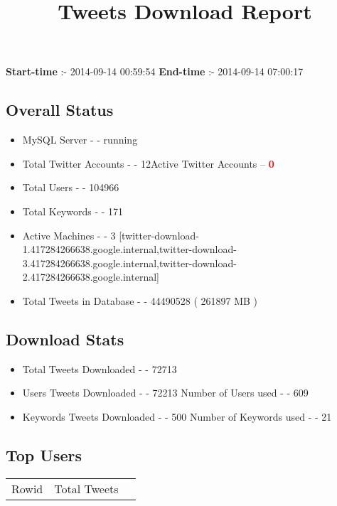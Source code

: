 \documentclass{article}\usepackage[T1]{fontenc}
\begin{document}
\title{\textbf{Tweets Download Report}}
               \date{}
                \maketitle
               \centerline{\textbf{Start-time} :- 2014-09-14 00:59:54 \hspace{40pt} \textbf{End-time} :- 2014-09-14 07:00:17}               \subsection*{Overall Status}                \begin{itemize}                \item MySQL Server - - running               \item Total Twitter Accounts - - 12\newline Active Twitter Accounts -- \textcolor{red}{\textbf{0}}               \item Total Users - - 104966               \item Total Keywords - - 171               \item Active Machines - - 3 [twitter-download-1.417284266638.google.internal,twitter-download-3.417284266638.google.internal,twitter-download-2.417284266638.google.internal]               \item Total Tweets in Database - - 44490528 ( 261897 MB )               \end{itemize}               \subsection*{Download Stats}                \begin{itemize}                \item Total Tweets Downloaded - - 72713               \item Users Tweets Downloaded - - 72213 \newline Number of Users used - - 609               \item Keywords Tweets Downloaded - - 500 \newline Number of Keywords used - - 21              \end{itemize}              \subsection*{Top Users}\begin{tabular}{|c|c|c|}         \hline         Rowid & Total Tweets \\ 

\end{tabular}
\end{document}
